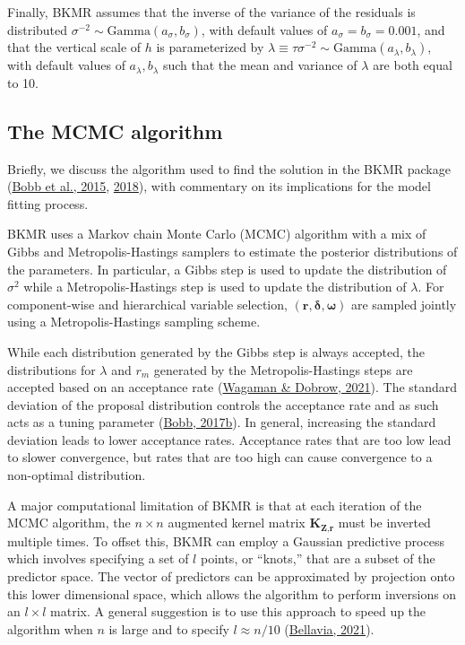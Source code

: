 \documentclass[12pt, twoside]{amherstthesis}
\begin{document}
Finally, BKMR assumes that the inverse of the variance of the residuals is distributed \(\sigma^{-2} \sim \text{Gamma}(a_\sigma, b_\sigma)\), with default values of \(a_\sigma=b_\sigma=0.001\), and that the vertical scale of \(h\) is parameterized by \(\lambda \equiv \tau\sigma^{-2} \sim \text{Gamma}(a_\lambda, b_\lambda)\), with default values of \(a_\lambda, b_\lambda\) such that the mean and variance of \(\lambda\) are both equal to 10.

\hypertarget{the-mcmc-algorithm}{%
\subsection{The MCMC algorithm}\label{the-mcmc-algorithm}}

Briefly, we discuss the algorithm used to find the solution in the BKMR package (\protect\hyperlink{ref-bobb_bayesian_2015}{Bobb et al., 2015}, \protect\hyperlink{ref-bobb_statistical_2018}{2018}), with commentary on its implications for the model fitting process.

BKMR uses a Markov chain Monte Carlo (MCMC) algorithm with a mix of Gibbs and Metropolis-Hastings samplers to estimate the posterior distributions of the parameters. In particular, a Gibbs step is used to update the distribution of \(\sigma^2\) while a Metropolis-Hastings step is used to update the distribution of \(\lambda\). For component-wise and hierarchical variable selection, \((\textbf{r}, \boldsymbol\delta, \boldsymbol\omega)\) are sampled jointly using a Metropolis-Hastings sampling scheme.

While each distribution generated by the Gibbs step is always accepted, the distributions for \(\lambda\) and \(r_m\) generated by the Metropolis-Hastings steps are accepted based on an acceptance rate (\protect\hyperlink{ref-wagaman_probability_2021}{Wagaman \& Dobrow, 2021}). The standard deviation of the proposal distribution controls the acceptance rate and as such acts as a tuning parameter (\protect\hyperlink{ref-bobb_example_2017}{Bobb, 2017b}). In general, increasing the standard deviation leads to lower acceptance rates. Acceptance rates that are too low lead to slower convergence, but rates that are too high can cause convergence to a non-optimal distribution.

A major computational limitation of BKMR is that at each iteration of the MCMC algorithm, the \(n \times n\) augmented kernel matrix \(\textbf{K}_{\textbf{Z},\textbf{r}}\) must be inverted multiple times. To offset this, BKMR can employ a Gaussian predictive process which involves specifying a set of \(l\) points, or ``knots,'' that are a subset of the predictor space. The vector of predictors can be approximated by projection onto this lower dimensional space, which allows the algorithm to perform inversions on an \(l\times l\) matrix. A general suggestion is to use this approach to speed up the algorithm when \(n\) is large and to specify \(l\approx n/10\) (\protect\hyperlink{ref-bellavia_statistical_2021}{Bellavia, 2021}).
\end{document}
